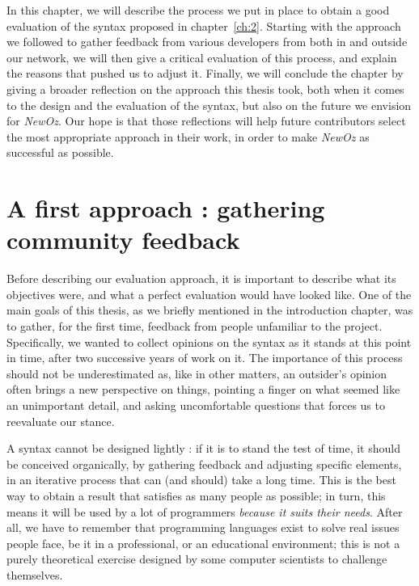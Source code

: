 In this chapter, we will describe the process we put in place to obtain a good evaluation of the syntax proposed in chapter~\ref{ch:2}.
Starting with the approach we followed to gather feedback from various developers from both in and outside our network,
we will then give a critical evaluation of this process, and explain the reasons that pushed us to adjust it.
Finally, we will conclude the chapter by giving a broader reflection on the approach this thesis took, both when it comes to the design and the evaluation of the syntax, but also on the future we envision for \textit{NewOz}.
Our hope is that those reflections will help future contributors select the most appropriate approach in their work, in order to make \textit{NewOz} as successful as possible.

\section{A first approach : gathering community feedback}\label{sec:ch4-GitHub}
Before describing our evaluation approach, it is important to describe what its objectives were, and what a perfect evaluation would have looked like.\newline
One of the main goals of this thesis, as we briefly mentioned in the introduction chapter, was to gather, for the first time, feedback from people unfamiliar to the project.
Specifically, we wanted to collect opinions on the syntax as it stands at this point in time, after two successive years of work on it.
The importance of this process should not be underestimated as, like in other matters, an outsider's opinion often brings a new perspective on things, pointing a finger on what seemed like an unimportant detail, and asking uncomfortable questions that forces us to reevaluate our stance.\newline

A syntax cannot be designed lightly : if it is to stand the test of time, it should be conceived organically, by gathering feedback and adjusting specific elements, in an iterative process that can (and should) take a long time.
This is the best way to obtain a result that satisfies as many people as possible;
in turn, this means it will be used by a lot of programmers \emph{because it suits their needs}.
After all, we have to remember that programming languages exist to solve real issues people face, be it in a professional, or an educational environment;
this is not a purely theoretical exercise designed by some computer scientists to challenge themselves.\newline

